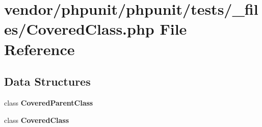\section{vendor/phpunit/phpunit/tests/\+\_\+files/\+Covered\+Class.php File Reference}
\label{phpunit_2tests_2__files_2_covered_class_8php}
\subsection*{Data Structures}
\begin{DoxyCompactItemize}
\item 
class {\bf Covered\+Parent\+Class}
\item 
class {\bf Covered\+Class}
\end{DoxyCompactItemize}
